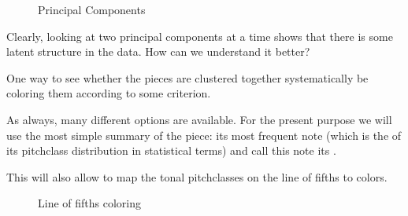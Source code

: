 \documentclass[letterpaper,10pt,english]{sphinxmanual}
\begin{document}
\noindent{}

\begin{figure}[htbp]
\centering
\capstart

\noindent{}
\caption{Principal Components}\label{\detokenize{data-driven_music_history:id5}}\end{figure}

Clearly, looking at two principal components at a time shows that there
is some latent structure in the data. How can we understand it better?

One way to see whether the pieces are clustered together systematically
be coloring them according to some criterion.

As always, many different options are available. For the present purpose
we will use the most simple summary of the piece: its most frequent note
(which is the  of its pitch\sphinxhyphen{}class distribution in statistical
terms) and call this note its .

This will also allow to map the tonal pitch\sphinxhyphen{}classes on the line of
fifths to colors.

\begin{figure}[htbp]
\centering
\capstart

\noindent{}
\caption{Line of fifths coloring}\label{\detokenize{data-driven_music_history:id6}}\end{figure}

\begin{sphinxVerbatim}[commandchars=\\\{\}]
\PYG{p}{[}\PYG{p}{]}    \PYG{p}{[}\PYG{p}{]}   
\end{sphinxVerbatim}
\end{document}
